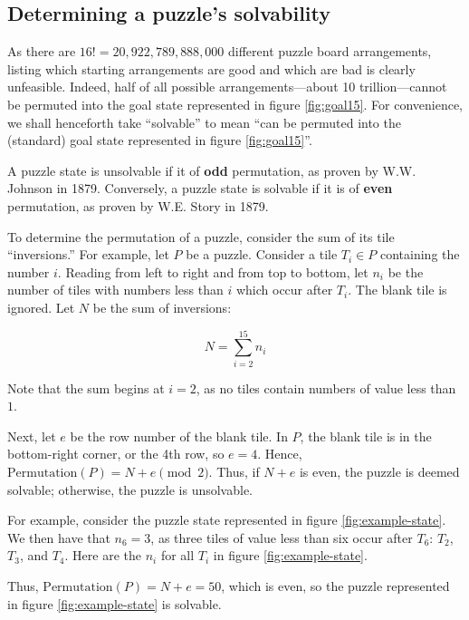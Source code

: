 \documentclass{article}
\begin{document}
  \subsection*{Determining a puzzle's solvability}
    As there are $16!=20,922,789,888,000$ different puzzle board arrangements,
    listing which starting arrangements are good and which are bad is
    clearly unfeasible. Indeed, half of all possible arrangements---about
    10 trillion---cannot be permuted into the goal state represented in figure
    \ref{fig:goal15}. For convenience, we shall henceforth take ``solvable'' to
    mean ``can be permuted into the (standard) goal state represented in figure
    \ref{fig:goal15}''.

    A puzzle state is unsolvable if it of \textbf{odd} permutation, as proven by
    W.W. Johnson in 1879. Conversely, a puzzle state is solvable if it is of
    \textbf{even} permutation, as proven by W.E. Story in 1879.

    To determine the permutation of a puzzle, consider the sum of its tile
    ``inversions.'' For example, let $P$ be a puzzle. Consider a tile $T_i\in P$
    containing the number $i$. Reading from left to right and from top to
    bottom, let $n_i$ be the number of tiles with numbers less than $i$ which
    occur after $T_i$. The blank tile is ignored. Let $N$ be the sum of
    inversions:

    $$
      N=\sum_{i=2}^{15} n_i
    $$

    Note that the sum begins at $i=2$, as no tiles contain numbers of value
    less than $1$.

    Next, let $e$ be the row number of the blank tile. In $P$, the blank tile
    is in the bottom-right corner, or the 4th row, so $e=4$. Hence,
    $\text{Permutation}(P)=N+e\pmod{2}$. Thus, if $N+e$ is even, the puzzle is
    deemed solvable; otherwise, the puzzle is unsolvable.

    

    For example, consider the puzzle state represented in figure
    \ref{fig:example-state}. We then have that $n_6=3$, as three tiles of value
    less than six occur after $T_6$: $T_2$, $T_3$, and $T_4$. Here are the $n_i$
    for all $T_i$ in figure \ref{fig:example-state}.

    

    Thus, $\text{Permutation}(P)= N + e= 50$, which is even, so the puzzle
    represented in figure \ref{fig:example-state} is solvable.
\end{document}
